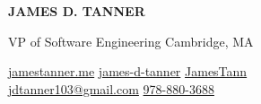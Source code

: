 \documentclass[10pt,a4paper,ragged2e,withhyper]{altacv}
\newcommand{\linkicon}[3]{#1\href{#2}{#3}}
\renewcommand{\namefont}{\Huge\rmfamily\bfseries}
\begin{document}
\begin{paracol}{2}
    {\namefont\color{name}\MakeUppercase{James D. Tanner}\par}
    \medskip
    {\taglinefont\color{tagline}VP of Software Engineering}
    \faMapMarker Cambridge, MA

    \switchcolumn
    \begin{flushright}
        \linkicon{\faGlobe}{http://jamestanner.me}{jamestanner.me}
        \linkicon{\faLinkedin}{https://linkedin.com/in/james-d-tanner}{james-d-tanner}
        \linkicon{\faGithub}{https://github.com/JamesTann}{JamesTann} \\
        \medskip
        \linkicon{\faAt}{mailto:jdtanner103@gmail.com}{jdtanner103@gmail.com}
        \linkicon{\faPhone}{tel:9788803688}{978-880-3688}
    \end{flushright}

\end{paracol}
\end{document}
